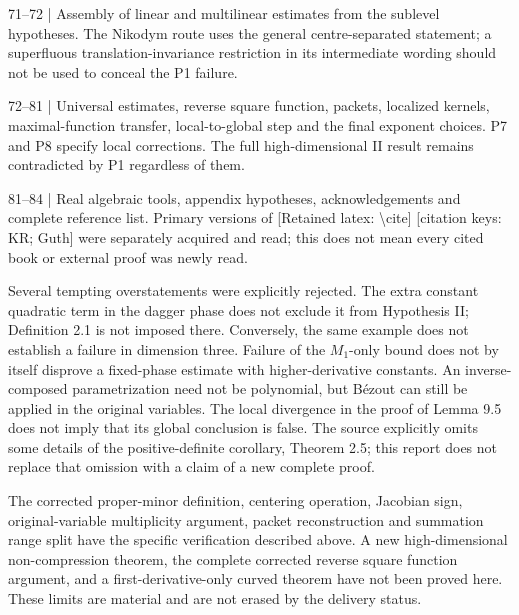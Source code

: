 \documentclass[10pt]{article}
\begin{document}
71–72 | Assembly of linear and multilinear estimates from the sublevel hypotheses. The Nikodym route uses the general centre-separated statement; a superfluous translation-invariance restriction in its intermediate wording should not be used to conceal the P1 failure.\par
72–81 | Universal estimates, reverse square function, packets, localized kernels, maximal-function transfer, local-to-global step and the final exponent choices. P7 and P8 specify local corrections. The full high-dimensional II result remains contradicted by P1 regardless of them.\par
81–84 | Real algebraic tools, appendix hypotheses, acknowledgements and complete reference list. Primary versions of [Retained latex: \textbackslash{}cite] [citation keys: KR; Guth] were separately acquired and read; this does not mean every cited book or external proof was newly read.\par
Several tempting overstatements were explicitly rejected. The extra constant quadratic term in the dagger phase does not exclude it from Hypothesis II; Definition 2.1 is not imposed there. Conversely, the same example does not establish a failure in dimension three. Failure of the \(M_1\)-only bound does not by itself disprove a fixed-phase estimate with higher-derivative constants. An inverse-composed parametrization need not be polynomial, but Bézout can still be applied in the original variables. The local divergence in the proof of Lemma 9.5 does not imply that its global conclusion is false. The source explicitly omits some details of the positive-definite corollary, Theorem 2.5; this report does not replace that omission with a claim of a new complete proof.\par
The corrected proper-minor definition, centering operation, Jacobian sign, original-variable multiplicity argument, packet reconstruction and summation range split have the specific verification described above. A new high-dimensional non-compression theorem, the complete corrected reverse square function argument, and a first-derivative-only curved theorem have not been proved here. These limits are material and are not erased by the delivery status.\par
\end{document}

